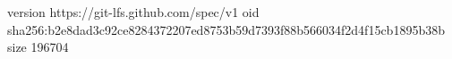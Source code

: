version https://git-lfs.github.com/spec/v1
oid sha256:b2e8dad3c92ce8284372207ed8753b59d7393f88b566034f2d4f15cb1895b38b
size 196704

